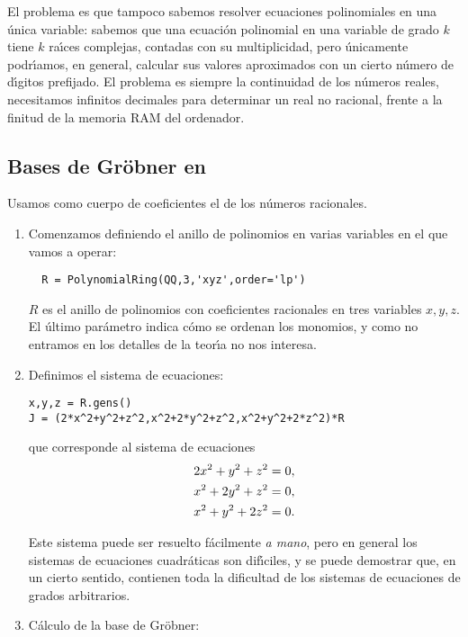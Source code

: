 El problema es que tampoco sabemos resolver ecuaciones polinomiales en una 
\'unica variable: sabemos que una ecuaci\'on polinomial en una variable de 
grado $k$ tiene $k$ ra\'{\i}ces complejas, contadas con su multiplicidad, pero 
\'unicamente podr\'{\i}amos, en general, calcular sus valores aproximados con 
un cierto n\'umero de d\'{\i}gitos prefijado. El problema es siempre la 
continuidad de los n\'umeros reales, necesitamos infinitos decimales para 
determinar un real no racional, frente a la finitud de la memoria RAM del 
ordenador. 

\subsection{Bases de Gr\"obner en \sage}
Usamos como cuerpo de coeficientes el de los n\'umeros racionales. 
\begin{enumerate}
 \item Comenzamos definiendo el anillo de polinomios en varias variables en el 
que vamos a operar:
 \begin{lstlisting}
  R = PolynomialRing(QQ,3,'xyz',order='lp')
 \end{lstlisting}

 \noindent $R$ es el anillo de polinomios con coeficientes racionales en tres 
variables $x,y,z.$ El \'ultimo par\'ametro indica c\'omo se ordenan los 
monomios, y como no entramos en los detalles de la teor\'{\i}a no nos interesa.
 
 
 \item Definimos el sistema de ecuaciones:
 \begin{lstlisting}
x,y,z = R.gens()
J = (2*x^2+y^2+z^2,x^2+2*y^2+z^2,x^2+y^2+2*z^2)*R
 \end{lstlisting}
 
\noindent que corresponde al sistema de ecuaciones
\begin{align*}\notag
  2x^2+y^2+z^2&=0,\\
  x^2+2y^2+z^2&=0,\\
  x^2+y^2+2z^2&=0.
 \end{align*}

Este sistema puede ser resuelto f\'acilmente {\itshape a mano}, pero en general 
los sistemas de ecuaciones cuadr\'aticas son dif\'{\i}ciles, y se puede 
demostrar que,  en un cierto sentido,  contienen toda la dificultad de los 
sistemas de ecuaciones de grados arbitrarios.

 \item C\'alculo de la base de Gr\"obner:
 

\end{enumerate}
